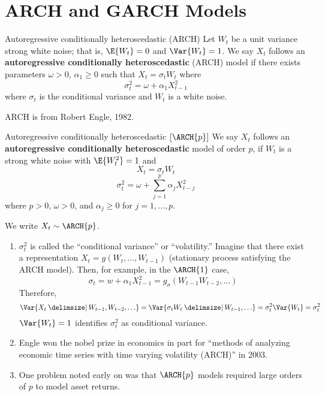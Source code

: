 \section{ARCH and GARCH Models}
\begin{Definition}{Autoregressive conditionally heteroscedastic (ARCH)}{}
    Let $ W_t $ be a unit variance strong white noise; that is,
    $ \E{W_t}=0 $ and $ \Var{W_t}=1 $. We say $ X_t $
    follows an \textbf{autoregressive conditionally heteroscedastic}
    (ARCH) model if there exists parameters $ \omega> 0 $, $ \alpha_1\ge 0 $
    such that $ X_t=\sigma_t W_t $ where
    \[ \sigma_t^2=\omega+\alpha_1 X_{t-1}^2 \]
    where $ \sigma_t $ is the conditional variance and $ W_t $
    is a white noise.
\end{Definition}
\begin{Remark}{}{}
    ARCH is from Robert Engle, 1982.
\end{Remark}
\begin{Definition}{Autoregressive conditionally heteroscedastic $ [\ARCH{p}] $}{}
    We say $ X_t $ follows an \textbf{autoregressive conditionally heteroscedastic} model
    of order $ p $, if $ W_t $ is a strong white noise with $ \E{W_t^2}=1 $
    and
    \[ X_t=\sigma_t W_t \]
    \[ \sigma_t^2=\omega+\sum_{j=1}^{p} \alpha_j X_{t-j}^2 \]
    where $ p>0 $, $ \omega>0$, and $\alpha_j\ge 0$ for $j=1,\ldots,p$.

    We write $ X_t \sim \ARCH{p} $.
\end{Definition}
\begin{Remark}{}{}
    \begin{enumerate}[(1)]
        \item $ \sigma_t^2 $ is called the ``conditional variance'' or ``volatility.''
              Imagine that there exist a representation $ X_t=g(W_t,\ldots,W_{t-1}) $
              (stationary process satisfying the ARCH model). Then, for example, in the
              $ \ARCH{1} $ case,
              \[ \sigma_t=w+\alpha_1 X_{t-1}^2=g_\sigma(W_{t-1}W_{t-2},\ldots) \]
              Therefore,
              \[ \Var{X_t\given W_{t-1},W_{t-2},\ldots}=\Var{\sigma_tW_t\given W_{t-1},\ldots}=\sigma_t^2\Var{W_t}=\sigma_t^2 \]
              $ \Var{W_t}=1 $ identifies $ \sigma_t^2 $ as conditional variance.
        \item Engle won the nobel prize in economics in part for ``methods of analyzing economic
              time series with time varying volatility (ARCH)'' in 2003.
        \item One problem noted early on was that $ \ARCH{p} $
              models required large orders of $ p $ to model asset returns.
    \end{enumerate}
\end{Remark}
